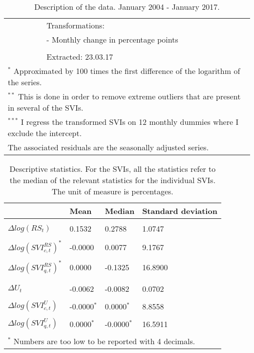 \begin{table}[!t]
\begin{tabularx}{\textwidth}{lllX}
		& & & Transformations: \\
		& & & - Monthly change in percentage points \\ \\
		& & & Extracted: 23.03.17 \\
		\bottomrule
		\multicolumn{4}{l}{$^{*}$ Approximated by 100 times the first difference of the logarithm of the series.} \\
		\multicolumn{4}{l}{$^{**}$ This is done in order to remove extreme outliers that are present in several of the SVIs.} \\
		\multicolumn{4}{l}{$^{***}$ I regress the transformed SVIs on 12 monthly dummies where I exclude the intercept.} \\
		\multicolumn{4}{l}{The associated residuals are the seasonally adjusted series.}
	\end{tabularx}
\caption{Description of the data. January 2004 - January 2017.}
	\label{tab:data}
\end{table}
\clearpage

\begin{table}[h]
	\center
	\scriptsize
	\begin{tabularx}{\textwidth}{@{}XXXX@{}}
		\toprule
 		& \textbf{Mean} & \textbf{Median} & \textbf{Standard deviation} \\ 
  		\midrule \\
		\textbf{$\Delta log(RS_t)$} & 0.1532 & 0.2788 & 1.0747 \\ \\
  		\textbf{$\Delta log(SVI_{c, t}^{RS})^*$} & -0.0000 & 0.0077 & 9.1767 \\ \\
  		\textbf{$\Delta log(SVI_{q, t}^{RS})^*$} & 0.0000 & -0.1325 & 16.8900 \\ \\
		\midrule \\
  		\textbf{$\Delta U_ t$} & -0.0062 & -0.0082 & 0.0702 \\ \\
  		\textbf{$\Delta log(SVI_{c, t}^{U})$} & -0.0000$^*$ & 0.0000$^*$ & 8.8558 \\ \\
  		\textbf{$\Delta log(SVI_{q, t}^{U})$} & 0.0000$^*$ & -0.0000$^*$ & 16.5911 \\ \\
   		\bottomrule
\multicolumn{4}{l}{$^*$ Numbers are too low to be reported with 4 decimals.}
	\end{tabularx}
\caption{Descriptive statistics. For the SVIs, all the statistics refer to the median of the relevant statistics for the individual SVIs. The unit of measure is percentages.}
	\label{desc_stat}
\end{table}

